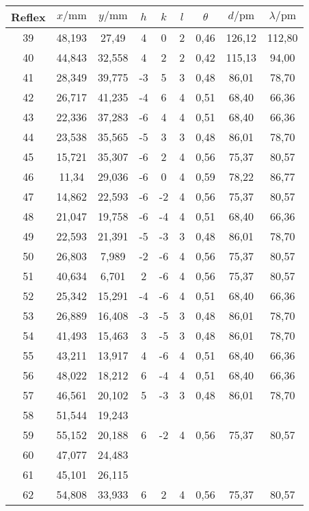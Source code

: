 \begin{table}[h]
\ContinuedFloat
\centering
\begin{tabular}{ccccccccc}
\toprule
Reflex & $x/\si{\milli\meter}$ & $y/\si{\milli\meter}$ & $h$ & $k$ & $l$ & $\theta$ & $d/\si{\pico\meter}$ & $\lambda/\si{\pico\meter}$\\
\midrule
39 & 48,193 & 27,49 & 4 & 0 & 2 & 0,46 & 126,12 & 112,80\\
40 & 44,843 & 32,558 & 4 & 2 & 2 & 0,42 & 115,13 & 94,00\\
41 & 28,349 & 39,775 & -3 & 5 & 3 & 0,48 & 86,01 & 78,70\\
42 & 26,717 & 41,235 & -4 & 6 & 4 & 0,51 & 68,40 & 66,36\\
43 & 22,336 & 37,283 & -6 & 4 & 4 & 0,51 & 68,40 & 66,36\\
44 & 23,538 & 35,565 & -5 & 3 & 3 & 0,48 & 86,01 & 78,70\\
45 & 15,721 & 35,307 & -6 & 2 & 4 & 0,56 & 75,37 & 80,57\\
46 & 11,34 & 29,036 & -6 & 0 & 4 & 0,59 & 78,22 & 86,77\\
47 & 14,862 & 22,593 & -6 & -2 & 4 & 0,56 & 75,37 & 80,57\\
48 & 21,047 & 19,758 & -6 & -4 & 4 & 0,51 & 68,40 & 66,36\\
49 & 22,593 & 21,391 & -5 & -3 & 3 & 0,48 & 86,01 & 78,70\\
50 & 26,803 & 7,989 & -2 & -6 & 4 & 0,56 & 75,37 & 80,57\\
51 & 40,634 & 6,701 & 2 & -6 & 4 & 0,56 & 75,37 & 80,57\\
52 & 25,342 & 15,291 & -4 & -6 & 4 & 0,51 & 68,40 & 66,36\\
53 & 26,889 & 16,408 & -3 & -5 & 3 & 0,48 & 86,01 & 78,70\\
54 & 41,493 & 15,463 & 3 & -5 & 3 & 0,48 & 86,01 & 78,70\\
55 & 43,211 & 13,917 & 4 & -6 & 4 & 0,51 & 68,40 & 66,36\\
56 & 48,022 & 18,212 & 6 & -4 & 4 & 0,51 & 68,40 & 66,36\\
57 & 46,561 & 20,102 & 5 & -3 & 3 & 0,48 & 86,01 & 78,70\\
58 & 51,544 & 19,243 &  &  &  &  &  & \\
59 & 55,152 & 20,188 & 6 & -2 & 4 & 0,56 & 75,37 & 80,57\\
60 & 47,077 & 24,483 &  &  &  &  &  & \\
61 & 45,101 & 26,115 &  &  &  &  &  & \\
62 & 54,808 & 33,933 & 6 & 2 & 4 & 0,56 & 75,37 & 80,57\\

\end{tabular}
\end{table}
